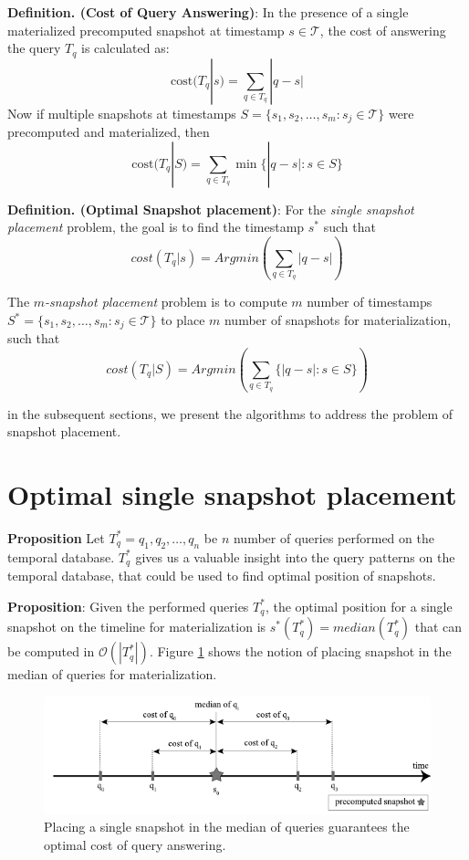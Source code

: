 \textbf{Definition. (Cost of Query Answering)}: In the presence of a single materialized precomputed snapshot at timestamp $s \in \mathcal{T}$, the cost of answering the query $T_q$ is calculated as:
$$\mathrm{cost}(T_q | s) = \sum_{q\in T_q} |q - s|$$
Now if multiple snapshots at timestamps $S=\{s_1, s_2, \dots, s_m : s_j \in \mathcal{T}\}$ were precomputed and materialized, then 
$$\mathrm{cost}(T_q|S) = \sum_{q\in T_q} \min\{|q-s| : s\in S\}$$

\textbf{Definition. (Optimal Snapshot placement)}: For the \emph{single snapshot placement} problem, the goal is to find the timestamp $s^*$ such that 
$$cost(T_q|s)= Arg min(\sum_{q\in T_q}|q - s|)$$

The \emph{$m$-snapshot placement} problem is to compute $m$ number of timestamps $S^*=\{s_1, s_2, \dots, s_m: s_j \in \mathcal{T}\}$ to place $m$ number of snapshots for materialization, such that 
$$cost(T_q|S)= Arg min(\sum_{q\in T_q}\{|q - s|:s \in S\})$$

in the subsequent sections, we present the algorithms to address the problem of snapshot placement.

\section{Optimal single snapshot placement}
\textbf{Proposition} Let $T_q^* = {q_1,q_2, \dots , q_n}$ be $n$ number of queries performed on the temporal database. $T_q^*$ gives us a valuable insight into the query patterns on the temporal database, that could be used to find optimal position of snapshots.

\textbf{Proposition}: Given the performed queries $T_q^*$, the optimal position for a single snapshot on the timeline for materialization is $s^*(T_q^*)=median(T_q^*)$ that can be computed in $\mathcal{O}(|T_q^*|)$. Figure \ref{fig:optimal_materialization} shows the notion of placing snapshot in the median of queries for materialization.

\begin{figure}
	\label{fig:optimal_materialization}
	\centering
	\includegraphics[width=\textwidth]{figs/optimal_materialization.pdf}
	\caption{Placing a single snapshot in the median of queries guarantees the optimal cost of query answering.}
\end{figure}

